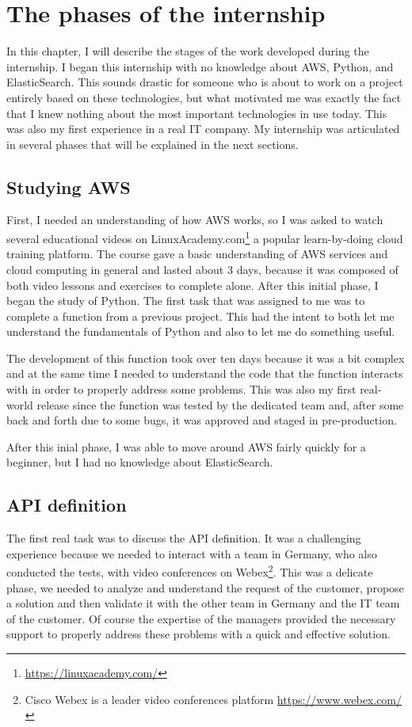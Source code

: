 \chapter{The phases of the internship}
\label{ch:phases}
In this chapter, I will describe the stages of the work developed
during the internship.  I began this internship with no knowledge
about AWS, Python, and ElasticSearch.  This sounds drastic for someone
who is about to work on a project entirely based on these
technologies, but what motivated me was exactly the fact that I knew
nothing about the most important technologies in use today.  This was
also my first experience in a real IT company.  My internship was
articulated in several phases that will be explained in the next
sections.

\section{Studying AWS}
\label{sec:studyAWS}
First, I needed an understanding of how AWS works, so I was asked to
watch several educational videos on
LinuxAcademy.com\footnote{\url{https://linuxacademy.com/}} a popular
learn-by-doing cloud training platform.  The course gave a basic
understanding of AWS services and cloud computing in general and
lasted about 3 days, because it was composed of both video lessons and
exercises to complete alone.  After this initial phase, I began the
study of Python. The first task that was assigned to me was to
complete a function from a previous project. This had the intent to
both let me understand the fundamentals of Python and also to let me
do something useful.

The development of this function took over ten days because it was a
bit complex and at the same time I needed to understand the code that
the function interacts with in order to properly address some
problems. This was also my first real-world release since the function
was tested by the dedicated team and, after some back and forth due to
some bugs, it was approved and staged in pre-production.

After this inial phase, I was able to move around AWS fairly quickly
for a beginner, but I had no knowledge about ElasticSearch.

\section{API definition}
\label{sec:api-def}
The first real task was to discuss the API definition. It was a
challenging experience because we needed to interact with a team in
Germany, who also conducted the tests, with video conferences on
Webex\footnote{Cisco Webex is a leader video conferences platform
  \url{https://www.webex.com/}}.  This was a delicate phase, we needed
to analyze and understand the request of the customer, propose a
solution and then validate it with the other team in Germany and the
IT team of the customer.  Of course the expertise of the managers
provided the necessary support to properly address these problems with
a quick and effective solution.


